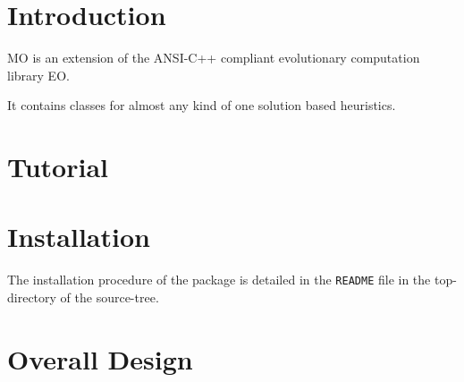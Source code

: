 \section{Introduction}\label{main_intro}
MO is an extension of the ANSI-C++ compliant evolutionary computation library EO. \par
 It contains classes for almost any kind of one solution based heuristics.\section{Tutorial}\label{main_tutorial}
\section{Installation}\label{main_install}
The installation procedure of the package is detailed in the {\tt README} file in the top-directory of the source-tree.\section{Overall Design}\label{main_design}
